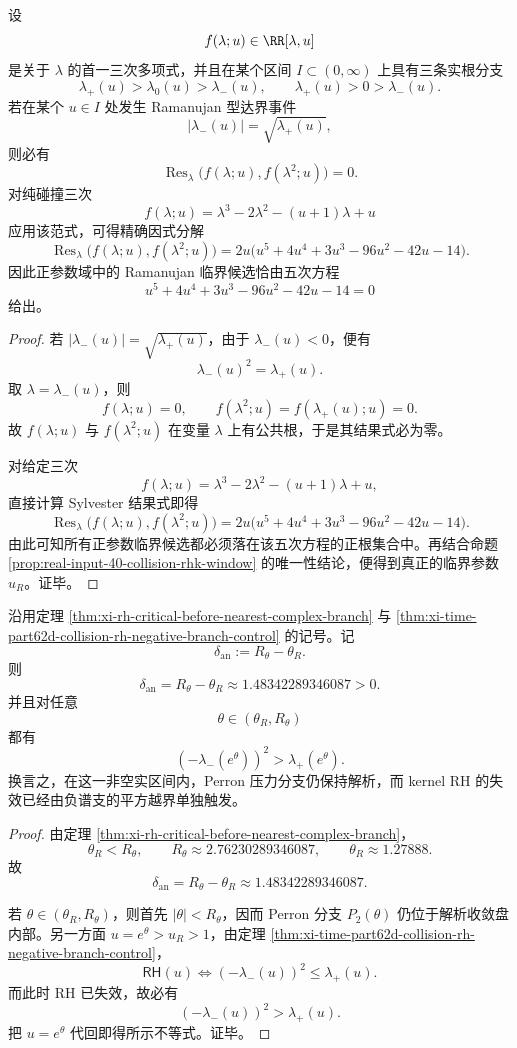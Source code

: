 \begin{proposition}[RH 临界参数的结果式消元范式]\label{prop:xi-time-part62d-collision-rh-resultant-template}
设
\[
f(\lambda;u)\in \RR[\lambda,u]
\]
是关于 \(\lambda\) 的首一三次多项式，并且在某个区间 \(I\subset(0,\infty)\) 上具有三条实根分支
\[
\lambda_+(u)>\lambda_0(u)>\lambda_-(u),
\qquad
\lambda_+(u)>0>\lambda_-(u).
\]
若在某个 \(u\in I\) 处发生 Ramanujan 型达界事件
\[
|\lambda_-(u)|=\sqrt{\lambda_+(u)},
\]
则必有
\[
\operatorname{Res}_{\lambda}\bigl(f(\lambda;u),f(\lambda^2;u)\bigr)=0.
\]
对纯碰撞三次
\[
f(\lambda;u)=\lambda^3-2\lambda^2-(u+1)\lambda+u
\]
应用该范式，可得精确因式分解
\[
\operatorname{Res}_{\lambda}\bigl(f(\lambda;u),f(\lambda^2;u)\bigr)
=
2u\bigl(u^5+4u^4+3u^3-96u^2-42u-14\bigr).
\]
因此正参数域中的 Ramanujan 临界候选恰由五次方程
\[
u^5+4u^4+3u^3-96u^2-42u-14=0
\]
给出。
\end{proposition}
\begin{proof}
若 \(|\lambda_-(u)|=\sqrt{\lambda_+(u)}\)，由于 \(\lambda_-(u)<0\)，便有
\[
\lambda_-(u)^2=\lambda_+(u).
\]
取 \(\lambda=\lambda_-(u)\)，则
\[
f(\lambda;u)=0,
\qquad
f(\lambda^2;u)=f(\lambda_+(u);u)=0.
\]
故 \(f(\lambda;u)\) 与 \(f(\lambda^2;u)\) 在变量 \(\lambda\) 上有公共根，于是其结果式必为零。

对给定三次
\[
f(\lambda;u)=\lambda^3-2\lambda^2-(u+1)\lambda+u,
\]
直接计算 Sylvester 结果式即得
\[
\operatorname{Res}_{\lambda}\bigl(f(\lambda;u),f(\lambda^2;u)\bigr)
=
2u\bigl(u^5+4u^4+3u^3-96u^2-42u-14\bigr).
\]
由此可知所有正参数临界候选都必须落在该五次方程的正根集合中。再结合命题 \ref{prop:real-input-40-collision-rhk-window} 的唯一性结论，便得到真正的临界参数 \(u_R\)。证毕。
\end{proof}

\begin{corollary}\label{cor:xi-time-part62d-analytic-nonrh-window-length}
沿用定理 \ref{thm:xi-rh-critical-before-nearest-complex-branch} 与
\ref{thm:xi-time-part62d-collision-rh-negative-branch-control} 的记号。记
\[
\delta_{\mathrm{an}}:=R_\theta-\theta_R.
\]
则
\[
\delta_{\mathrm{an}}
=
R_\theta-\theta_R
\approx
1.48342289346087>0.
\]
并且对任意
\[
\theta\in(\theta_R,R_\theta)
\]
都有
\[
(-\lambda_-(e^\theta))^2>\lambda_+(e^\theta).
\]
换言之，在这一非空实区间内，Perron 压力分支仍保持解析，而 kernel RH 的失效已经由负谱支的平方越界单独触发。
\end{corollary}
\begin{proof}
由定理 \ref{thm:xi-rh-critical-before-nearest-complex-branch}，
\[
\theta_R<R_\theta,
\qquad
R_\theta\approx 2.76230289346087,
\qquad
\theta_R\approx 1.27888.
\]
故
\[
\delta_{\mathrm{an}}=R_\theta-\theta_R\approx 1.48342289346087.
\]

若 \(\theta\in(\theta_R,R_\theta)\)，则首先 \(|\theta|<R_\theta\)，因而 Perron 分支 \(P_2(\theta)\) 仍位于解析收敛盘内部。另一方面 \(u=e^\theta>\!u_R>1\)，由定理 \ref{thm:xi-time-part62d-collision-rh-negative-branch-control}，
\[
\textsf{RH}(u)\iff (-\lambda_-(u))^2\le \lambda_+(u).
\]
而此时 RH 已失效，故必有
\[
(-\lambda_-(u))^2>\lambda_+(u).
\]
把 \(u=e^\theta\) 代回即得所示不等式。证毕。
\end{proof}

